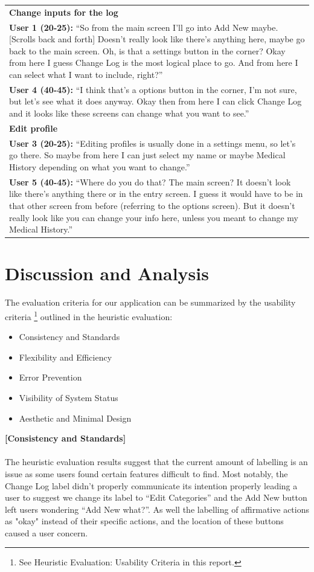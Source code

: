 \documentclass[pdftex,12pt,a4paper]{report}
\begin{document}
\begin{center}
\begin{longtable}{|p{\textwidth}|}
	\hline
	\textbf{Change inputs for the log}\\
	\textbf{User 1 (20-25):} ``So from the main screen I'll go into Add New maybe. [Scrolls back and forth] Doesn't really look like there's anything here, maybe go back to the main screen. Oh, is that a settings button in the corner? Okay from here I guess Change Log is the most logical place to go. And from here I can select what I want to include, right?''\\
	\textbf{User 4 (40-45):} ``I think that's a options button in the corner, I'm not sure, but let's see what it does anyway. Okay then from here I can click Change Log and it looks like these screens can change what you want to see.''\\
	\hline
	\textbf{Edit profile}\\
	\textbf{User 3 (20-25):} ``Editing profiles is usually done in a settings menu, so let's go there. So maybe from here I can just select my name or maybe Medical History depending on what you want to change.''\\
	\textbf{User 5 (40-45):} ``Where do you do that? The main screen? It doesn't look like there's anything there or in the entry screen. I guess it would have to be in that other screen from before (referring to the options screen). But it doesn't really look like you can change your info here, unless you meant to change my Medical History.''\\
	\hline
	\end{longtable}
\end{center}

\chapter{Discussion and Analysis}
The evaluation criteria for our application can be summarized by the usability criteria \footnote{See Heuristic Evaluation: Usability Criteria in this report.} outlined in the heuristic evaluation:
\begin{itemize}
\item{Consistency and Standards}
\item{Flexibility and Efficiency}
\item{Error Prevention}
\item{Visibility of System Status}
\item{Aesthetic and Minimal Design}
\end{itemize}

\noindent\textbf{[Consistency and Standards]}\\\\
The heuristic evaluation results suggest that the current amount of labelling is an issue as some users found certain features difficult to find. Most notably, the Change Log label didn't properly communicate its intention properly leading a user to suggest we change its label to ``Edit Categories'' and the Add New button left users wondering ``Add New what?''. As well the labelling of affirmative actions as "okay" instead of their specific actions, and the location of these buttons caused a user concern.\\
\end{document}
